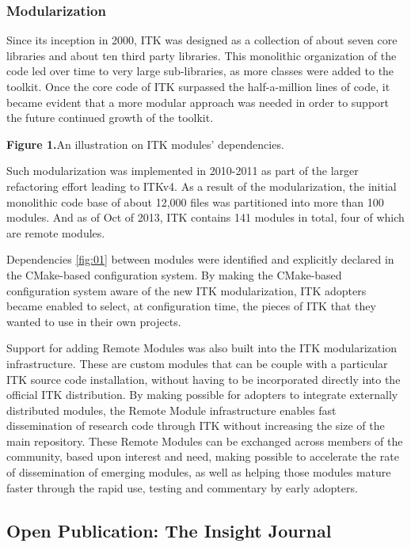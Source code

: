 \documentclass{frontiersENG} %
\begin{document}
\subsubsection{Modularization}

Since its inception in 2000, ITK was designed as a collection of about seven
core libraries and about ten third party libraries.  This monolithic
organization of the code led over time to very large sub-libraries, as more
classes were added to the toolkit. Once the core code of ITK surpassed the
half-a-million lines of code, it became evident that a more modular approach
was needed in order to support the future continued growth of the toolkit.

\textbf{Figure 1.}{An illustration on ITK modules' dependencies.}\label{fig:01}

Such modularization was implemented in 2010-2011 as part of the larger
refactoring effort leading to ITKv4.  As a result of the modularization, the
initial monolithic code base of about 12,000 files was partitioned into more
than 100 modules.  And as of Oct of 2013, ITK contains 141 modules in total,
four of which are remote modules.

Dependencies \ref{fig:01} between modules were identified and explicitly
declared in the CMake-based configuration system. By making the CMake-based
configuration system aware of the new ITK modularization, ITK adopters became
enabled to select, at configuration time, the pieces of ITK that they wanted to
use in their own projects.

Support for adding Remote Modules was also built into the ITK modularization
infrastructure. These are custom modules that can be couple with a particular
ITK source code installation, without having to be incorporated directly into
the official ITK distribution. By making possible for adopters to integrate
externally distributed modules, the Remote Module infrastructure enables fast
dissemination of research code through ITK without increasing the size of the
main repository. These Remote Modules can be exchanged across members of the
community, based upon interest and need, making possible to accelerate the rate
of dissemination of emerging modules, as well as helping those modules mature
faster through the rapid use, testing and commentary by early adopters.


\subsection{Open Publication: The Insight Journal}
\end{document}
